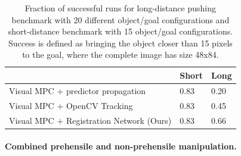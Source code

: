 \begin{table}
	{\footnotesize
		\begin{center}
			\begin{tabular}{l|p{1cm}|p{1cm}}
				\hline
				& Short & Long \\
				\hline
			   Visual MPC $+$ predictor propagation  & 0.83 & 0.20 \\
  			   Visual MPC $+$ OpenCV Tracking  & 0.83  & 0.45\\
			   Visual MPC $+$ Registration Network (Ours)  & 0.83 & $\mathbf{0.66}$  \\
				\hline
			\end{tabular}
		\end{center}
	}
	\caption{Fraction of successful runs for long-distance pushing benchmark with 20 different object/goal configurations and short-distance benchmark with 15 object/goal configurations. Success is defined as bringing the object closer than 15 pixels to the goal, where the complete image has size 48x84.}
	\label{table:res_longd}
	\vspace{-0.35in}
\end{table}




\vspace{-0.1in}
\paragraph{Combined prehensile and non-prehensile manipulation.}

